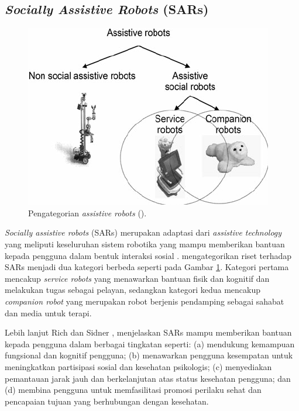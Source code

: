 \subsection{\emph{Socially Assistive Robots} (SARs)}
\label{subsec:sociallyassistiverobots}

\begin{figure}[ht]
  \centering
  \includegraphics[scale=0.35]{gambar/kategori-sars.png}
  \caption{Pengategorian \emph{assistive robots} (\citet{cit:heerink2010}).}
  \label{fig:kategorisars}
\end{figure}

\emph{Socially assistive robots} (SARs) merupakan adaptasi dari \emph{assistive technology} yang meliputi keseluruhan sistem robotika yang mampu memberikan bantuan kepada pengguna dalam bentuk interaksi sosial \citep{cit:seifer2005}. \citet{cit:heerink2010} mengategorikan riset terhadap SARs menjadi dua kategori berbeda seperti pada Gambar \ref{fig:kategorisars}.
Kategori pertama mencakup \emph{service robots} yang menawarkan bantuan fisik dan kognitif dan melakukan tugas sebagai pelayan, sedangkan kategori kedua mencakup \emph{companion robot} yang merupakan robot berjenis pendamping sebagai sahabat dan media untuk terapi.

Lebih lanjut Rich dan Sidner \citep{cit:rich2009}, menjelaskan SARs mampu memberikan bantuan kepada pengguna dalam berbagai tingkatan seperti:
(a) mendukung kemampuan fungsional dan kognitif pengguna;
(b) menawarkan pengguna kesempatan untuk meningkatkan partisipasi sosial dan kesehatan psikologis;
(c) menyediakan pemantauan jarak jauh dan berkelanjutan atas status kesehatan pengguna;
dan (d) membina pengguna untuk memfasilitasi promosi perilaku sehat dan pencapaian tujuan yang berhubungan dengan kesehatan.
